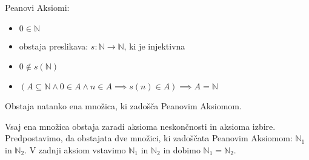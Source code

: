 \begin{definicija}
    Peanovi Aksiomi:
    \begin{itemize}
        \item $0 \in \mathbb{N}$
        \item obstaja preslikava: $s: \mathbb{N} \to \mathbb{N}$, ki je injektivna
        \item $0 \notin s(\mathbb{N})$
        \item $(A \subseteq \mathbb{N} \wedge 0 \in A \wedge n \in A \implies s(n) \in A) \implies A = \mathbb{N}$
    \end{itemize}
\end{definicija}

\begin{trditev}
    Obstaja natanko ena množica, ki zadošča Peanovim Aksiomom.
\end{trditev}
\begin{dokaz}
Vsaj ena množica obstaja zaradi aksioma neskončnosti in aksioma izbire.
Predpostavimo, da obstajata dve množici, ki zadoščata Peanovim Aksiomom: $\mathbb{N}_1$ in $\mathbb{N}_2$.
V zadnji aksiom vstavimo $\mathbb{N}_1$ in $\mathbb{N}_2$ in dobimo $\mathbb{N}_1 = \mathbb{N}_2$.
\end{dokaz}
